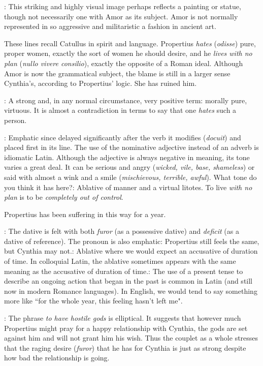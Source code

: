 
: This striking and highly visual image perhaps reflects a painting or statue, though not necessarily one with Amor as its subject.  Amor is not normally represented in so aggressive and militaristic a fashion in ancient art.


These lines recall Catullus in spirit and language.  Propertius \textit{hates} (\textit{odisse}) pure, proper women, exactly the sort of women he should desire, and he \textit{lives with no plan} (\textit{nullo vivere consilio}), exactly the opposite of a Roman ideal.  Although Amor is now the grammatical subject, the blame is still in a larger sense Cynthia's, according to Propertius' logic.  She has ruined him.


: A strong and, in any normal circumstance, very positive term: morally pure, virtuous.  It is almost a contradiction in terms to say that one \textit{hates} such a person.


: Emphatic since delayed significantly after the verb it modifies (\textit{docuit}) and placed first in its line.  The use of the nominative adjective instead of an adverb is idiomatic Latin.  Although the adjective is always negative in meaning, its tone varies a great deal.  It can be serious and angry (\textit{wicked, vile, base, shameless}) or said with almost a wink and a smile (\textit{mischievous, terrible, awful}).  What tone do you think it has here?\indent{}: Ablative of manner and a virtual litotes. To live \textit{with no plan} is to be \textit{completely out of control}.


Propertius has been suffering in this way for a year.


: The dative is felt with both \textit{furor} (as a possessive dative) and \textit{deficit} (as a dative of reference).  The pronoun is also emphatic: Propertius still feels the same, but Cynthia may not.\indent{}: Ablative where we would expect an accusative of duration of time.  In colloquial Latin, the ablative sometimes appears with the same meaning as the accusative of duration of time.\indent{}: The use of a present tense to describe an ongoing action that began in the past is common in Latin (and still now in modern Romance languages).  In English, we would tend to say something more like ``for the whole year, this feeling hasn't left me".


: The phrase \textit{to have hostile gods} is elliptical.  It suggests that however much Propertius might pray for a happy relationship with Cynthia, the gods are set against him and will not grant him his wish.  Thus the couplet as a whole stresses that the raging desire (\textit{furor}) that he has for Cynthia is just as strong despite how bad the relationship is going.
